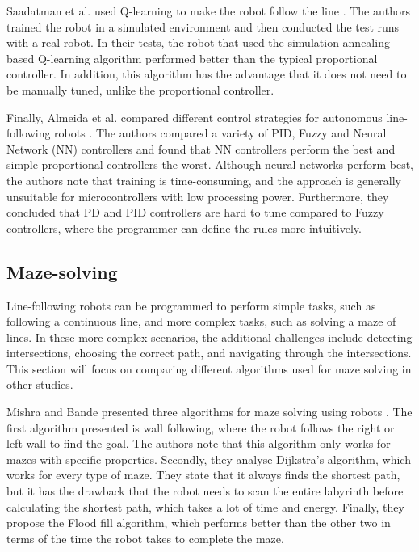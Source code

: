Saadatman et al. used Q-learning to make the robot follow the line \cite{saadatmand}. The authors trained the robot in a simulated environment and then conducted the test runs with a real robot. In their tests, the robot that used the simulation annealing-based Q-learning algorithm performed better than the typical proportional controller. In addition, this algorithm has the advantage that it does not need to be manually tuned, unlike the proportional controller.

Finally, Almeida et al. compared different control strategies for autonomous line-following robots \cite{almeida}. The authors compared a variety of PID, Fuzzy and Neural Network (NN) controllers and found that NN controllers perform the best and simple proportional controllers the worst. Although neural networks perform best, the authors note that training is time-consuming, and the approach is generally unsuitable for microcontrollers with low processing power. Furthermore, they concluded that PD and PID controllers are hard to tune compared to Fuzzy controllers, where the programmer can define the rules more intuitively.

\subsection{Maze-solving}

Line-following robots can be programmed to perform simple tasks, such as following a continuous line, and more complex tasks, such as solving a maze of lines. In these more complex scenarios, the additional challenges include detecting intersections, choosing the correct path, and navigating through the intersections. This section will focus on comparing different algorithms used for maze solving in other studies.

Mishra and Bande presented three algorithms for maze solving using robots \cite{mishra}. The first algorithm presented is wall following, where the robot follows the right or left wall to find the goal. The authors note that this algorithm only works for mazes with specific properties. 
Secondly, they analyse Dijkstra's algorithm, which works for every type of maze. They state that it always finds the shortest path, but it has the drawback that the robot needs to scan the entire labyrinth before calculating the shortest path, which takes a lot of time and energy.
Finally, they propose the Flood fill algorithm, which performs better than the other two in terms of the time the robot takes to complete the maze.

